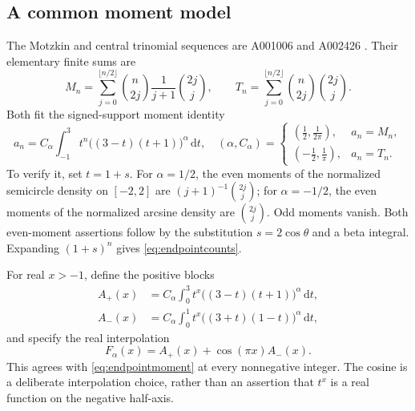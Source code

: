 \documentclass[11pt,a4paper]{article}
\theoremstyle{definition}
\theoremstyle{remark}
\newcommand{\dd}{\mathrm d}
\numberwithin{equation}{section}
\begin{document}
\subsection{A common moment model}
The Motzkin and central trinomial sequences are A001006 and A002426 \cite{oeismotzkin,oeistrinomial}. Their elementary finite sums are
\begin{equation}
 M_n=\sum_{j=0}^{\lfloor n/2\rfloor}\binom n{2j}\frac1{j+1}\binom{2j}j,
 \qquad
 T_n=\sum_{j=0}^{\lfloor n/2\rfloor}\binom n{2j}\binom{2j}j.
 \label{eq:endpointcounts}
\end{equation}
Both fit the signed-support moment identity
\begin{equation}
 a_n=C_\alpha\int_{-1}^3 t^n\bigl((3-t)(t+1)\bigr)^\alpha\,\dd t,
 \quad
 (\alpha,C_\alpha)=
 \begin{cases}
 (\tfrac12,\tfrac1{2\pi}),&a_n=M_n,\\
 (-\tfrac12,\tfrac1\pi),&a_n=T_n.
 \end{cases}
 \label{eq:endpointmoment}
\end{equation}
To verify it, set $t=1+s$. For $\alpha=1/2$, the even moments of the normalized semicircle density on $[-2,2]$ are $(j+1)^{-1}\binom{2j}j$; for $\alpha=-1/2$, the even moments of the normalized arcsine density are $\binom{2j}j$. Odd moments vanish. Both even-moment assertions follow by the substitution $s=2\cos\theta$ and a beta integral. Expanding $(1+s)^n$ gives \eqref{eq:endpointcounts}.

For real $x>-1$, define the positive blocks
\begin{align}
 A_+(x)&=C_\alpha\int_0^3t^x\bigl((3-t)(t+1)\bigr)^\alpha\,\dd t,\nonumber\\
 A_-(x)&=C_\alpha\int_0^1t^x\bigl((3+t)(1-t)\bigr)^\alpha\,\dd t,
 \label{eq:endpointblocks}
\end{align}
and specify the real interpolation
\begin{equation}
 F_\alpha(x)=A_+(x)+\cos(\pi x)A_-(x).
 \label{eq:endpointinterp}
\end{equation}
This agrees with \eqref{eq:endpointmoment} at every nonnegative integer. The cosine is a deliberate interpolation choice, rather than an assertion that $t^x$ is a real function on the negative half-axis.
\end{document}
